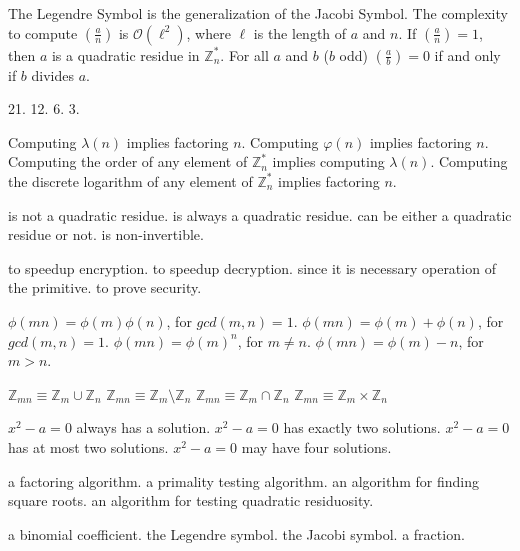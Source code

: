 {The Legendre Symbol is the generalization of the Jacobi Symbol.}
{The complexity to compute $\left ( \frac{a}{n} \right )$ is $\mathcal{O}(\ell^2)$, where $\ell$ is the length of $a$ and $n$.}
{If $\left ( \frac{a}{n} \right )=1$, then $a$ is a quadratic residue in $\mathbb{Z}_n^*$.}
{For all $a$ and $b$ ($b$ odd) $\left ( \frac{a}{b} \right )=0$ if and only if  $b$ divides $a$.}

{21.}
{12.}
{6.}
{3.}

{Computing $\lambda(n)$ implies factoring $n$.}
{ Computing $\varphi(n)$ implies factoring $n$.}
{ Computing  the order of any element of $\mathbb{Z}_{n}^*$ implies computing $\lambda(n)$.}
{Computing the discrete logarithm of any element of $\mathbb{Z}_{n}^*$ implies factoring $n$.}

{is not a quadratic residue.}
{is always a quadratic residue.}
{can be either a quadratic residue or not.}
{ is non-invertible.}

{to speedup encryption.}
{to speedup decryption.}
{since it is necessary operation of the primitive.}
{ to prove security.}

{$\phi(mn)=\phi(m)\phi(n)$, for $gcd(m,n)=1$.}
{$\phi(mn)=\phi(m)+\phi(n)$, for $gcd(m,n)=1$.}
{$\phi(mn)=\phi(m)^n$, for $m\ne n$.}
{$\phi(mn)=\phi(m)-n$, for $m > n$.}

 {$\mathbb{Z}_{mn} \equiv \mathbb{Z}_{m} \cup \mathbb{Z}_{n}$}
 {$\mathbb{Z}_{mn} \equiv \mathbb{Z}_{m} \setminus \mathbb{Z}_{n}$}
 {$\mathbb{Z}_{mn} \equiv \mathbb{Z}_{m} \cap \mathbb{Z}_{n}$}
 {$\mathbb{Z}_{mn} \equiv \mathbb{Z}_{m} \times \mathbb{Z}_{n}$}
 
{$x^2 - a = 0$ always has a solution.}
{$x^2 - a = 0$ has exactly two solutions.}
{$x^2 - a = 0$ has at most two solutions.}
{$x^2 - a = 0$ may have four solutions.}

{a factoring algorithm.}
{a primality testing algorithm.}
{an algorithm for finding square roots.}
{an algorithm for testing quadratic residuosity.}


{a binomial coefficient.}
{the Legendre symbol.}
{the Jacobi symbol.}
{a fraction.}

